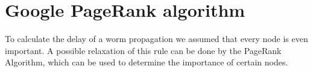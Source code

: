 %
%
%
%
%
%	
%	
%
%	
%				
%				
%				
%		
\section{Google PageRank algorithm}

To calculate the delay of a worm propagation we assumed that every node is even important. A possible relaxation of this rule can be done by the PageRank Algorithm, which can be used to determine the importance of certain nodes. 

